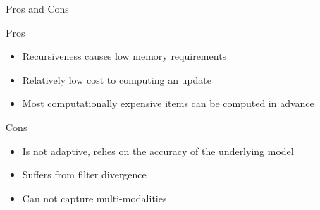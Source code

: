 \documentclass{beamer}
\begin{document}
\begin{frame}{Pros and Cons}
  \begin{box}{Pros}
    \begin{itemize}
   \pause  
    \item Recursiveness causes low memory requirements
   \pause  
    \item Relatively low cost to computing an update
   \pause  
    \item Most computationally expensive items can be computed in advance

    \end{itemize}
  \end{box}
\pause
  \begin{box}{Cons}
    \begin{itemize}
\pause
    \item  Is not adaptive, relies on the accuracy of the underlying model
\pause

  \item  Suffers from filter divergence

  \pause 

    \item  Can not capture multi-modalities
    \end{itemize}

  \end{box}
\end{frame}
  
\end{document}
